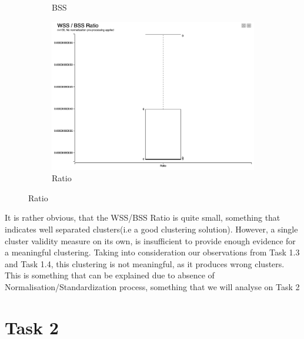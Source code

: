 \documentclass[11pt]{article}
\begin{document}
\begin{figure}[H]
\begin{subfigure}{0.4\textwidth}
						\caption{BSS}
						\label{fig:second}
					\end{subfigure}
					\hfill
					\begin{subfigure}{0.4\textwidth}
						\includegraphics[width=\textwidth]{res/t1/t15/t15-Ratio-plot}
						\caption{Ratio}
						\label{fig:third}
					\end{subfigure}
					\label{fig:figures}	
				\end{figure}
				\fi
				It is rather obvious, that the WSS/BSS Ratio is quite small, something that indicates well separated clusters(i.e a good clustering solution). However, a single cluster validity measure on its own, is insufficient to provide enough evidence for a meaningful clustering. Taking into consideration our observations from Task 1.3 and Task 1.4, this clustering \cite{???}is not meaningful, as it produces wrong clusters. This is something that can be explained due to absence of Normalisation/Standardization process, something that we will analyse on Task 2
	\section*{Task 2}
\end{document}
